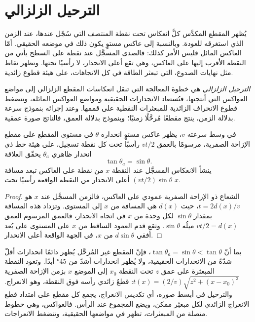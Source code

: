 \section{الترحيل الزلزالي}

يُظهر المقطع المكدَّس كلَّ انعكاس تحت نقطة المنتصف التي سُجّل عندها،
عند الزمن الذي استغرقه للعودة. وبالنسبة إلى عاكس مستوٍ يكون ذلك في موضعه الحقيقي.
أمّا العاكس المائل فليس الأمر كذلك: فالصدى المسجَّل عند نقطة على السطح يأتي من النقطة
الأقرب إليها على العاكس، وهي تقع أعلى الانحدار، لا رأسيًا تحتها.
وتظهر نقاط مثل نهايات الصدوع، التي تبعثر الطاقة في كل الاتجاهات،
على هيئة قطوع زائدية.

\begin{definition}\label{def:b3:exploration-seismology:migration}
\emph{الترحيل الزلزالي} هي خطوة المعالجة التي
تنقل انعكاسات المقطع الزلزالي إلى مواضع العواكس التي أنتجتها، فتُستعاد الانحدارات الحقيقية
ومواضع العواكس المائلة، وتنضغط قطوع الانحراف الزائدية للمبعثرات النقطية
على قممها. وعند إجرائه بنموذج سرعة بدلالة الزمن، ينتج مقطعًا مُرحَّلًا زمنيًا؛
وبنموذج بدلالة العمق،
فالناتج صورة عمقية.
\end{definition}

\begin{theorem}\label{thm:b3:exploration-seismology:dip}
في وسط سرعته $v$، يظهر عاكس مستوٍ انحداره $\theta$ في مستوى المقطع
على مقطع الإزاحة الصفرية، مرسومًا بالعمق $vt/2$ رأسيًا تحت كل نقطة تسجيل،
على هيئة خط ذي انحدار ظاهري $\theta_a$ يحقّق
العلاقة
\[
  \tan\theta_a = \sin\theta .
\]
ينشأ الانعكاس المسجَّل عند النقطة $x$ من نقطة على العاكس تبعد
مسافة $(vt/2)\sin\theta$ أعلى الانحدار من النقطة الواقعة رأسيًا تحت $x$.
\end{theorem}

\begin{proof}
الشعاع ذو الإزاحة الصفرية عمودي على العاكس، فالزمن المسجَّل عند $x$
هو $t = 2d(x)/v$، حيث $d(x)$ هي المسافة من $x$ إلى المستوى. وتزداد هذه المسافة
بمقدار $\sin\theta$ لكل وحدة من $x$ في اتجاه الانحدار، فالعمق المرسوم
العمق $vt/2 = d(x)$ ميلُه $\sin\theta$. وتقع قدم العمود الساقط من $x$
على المستوى على بُعد أفقي $d\sin\theta$ من $x$،
في الجهة الواقعة أعلى الانحدار.
\end{proof}

بما أنّ $\tan\theta_a = \sin\theta < \tan\theta$، فإنّ المقطع غير المُرحَّل يُظهر دائمًا
انحدارات أقلّ شدّةً من الانحدارات الحقيقية، ولا يُظهر انحدارات أشدّ من
\ang{45} أبدًا. وتعود النقطة المبعثرة على عمق $z$ تحت النقطة $x_0$ إلى الموضع $x$
بزمن الإزاحة الصفرية $t(x) = (2/v)\sqrt{z^2 + (x - x_0)^2}$: قطعٌ زائدي رأسه
فوق النقطة، وهو الانعراج. والترحيل في أبسط صوره، أي تكديس الانعراج،
يجمع كل مقطع على امتداد قطع الانعراج الزائدي لكل مبعثِر ممكن،
ويضع المجموع عند الرأس. فالعواكس، وهي خطوط متصلة من المبعثرات،
تظهر في مواضعها الحقيقية،
وتنضغط الانعراجات.

